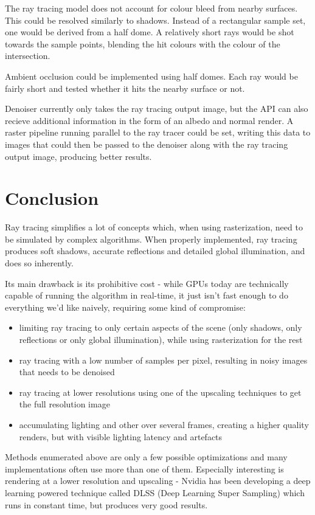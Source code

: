 \documentclass[times, utf8, zavrsni, numeric]{fer}
\begin{document}
The ray tracing model does not account for colour bleed from nearby surfaces. This could be resolved similarly to shadows. Instead of a rectangular sample set, one would be derived from a half dome. A relatively short rays would be shot towards the sample points, blending the hit colours with the colour of the intersection.

Ambient occlusion could be implemented using half domes. Each ray would be fairly short and tested whether it hits the nearby surface or not.

Denoiser currently only takes the ray tracing output image, but the API can also recieve additional information in the form of an albedo and normal render. A raster pipeline running parallel to the ray tracer could be set, writing this data to images that could then be passed to the denoiser along with the ray tracing output image, producing better results.

\chapter{Conclusion}
Ray tracing simplifies a lot of concepts which, when using rasterization, need to be simulated by complex algorithms. When properly implemented, ray tracing produces soft shadows, accurate reflections and detailed global illumination, and does so inherently.

Its main drawback is its prohibitive cost - while GPUs today are technically capable of running the algorithm in real-time, it just isn't fast enough to do everything we'd like naively, requiring some kind of compromise:
\begin{itemize}
	\item limiting ray tracing to only certain aspects of the scene (only shadows, only reflections or only global illumination), while using rasterization for the rest
	\item ray tracing with a low number of samples per pixel, resulting in noisy images that needs to be denoised
	\item ray tracing at lower resolutions using one of the upscaling techniques to get the full resolution image
	\item accumulating lighting and other over several frames, creating a higher quality renders, but with visible lighting latency and artefacts
\end{itemize}

Methods enumerated above are only a few possible optimizations and many implementations often use more than one of them. Especially interesting is rendering at a lower resolution and upscaling - Nvidia has been developing a deep learning powered technique called DLSS (Deep Learning Super Sampling) which runs in constant time, but produces very good results.
\end{document}
